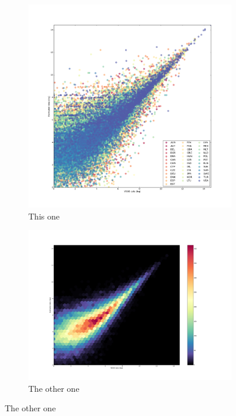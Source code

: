 \documentclass[a4paper]{article}
\begin{document}
\begin{figure}
\centering
\begin{subfigure}{0.49\linewidth}
	\centering
	\includegraphics[height=.95\textwidth]{images/est_v_data.png}
	\caption{This one}
	\label{fig:scatter}
\end{subfigure}
\begin{subfigure}{0.49\linewidth}
	\centering
	\includegraphics[height=.95\textwidth]{images/est_v_data_density.png}
	\caption{The other one}
	\label{fig:density}
\end{subfigure}
\end{figure}
\end{document}
